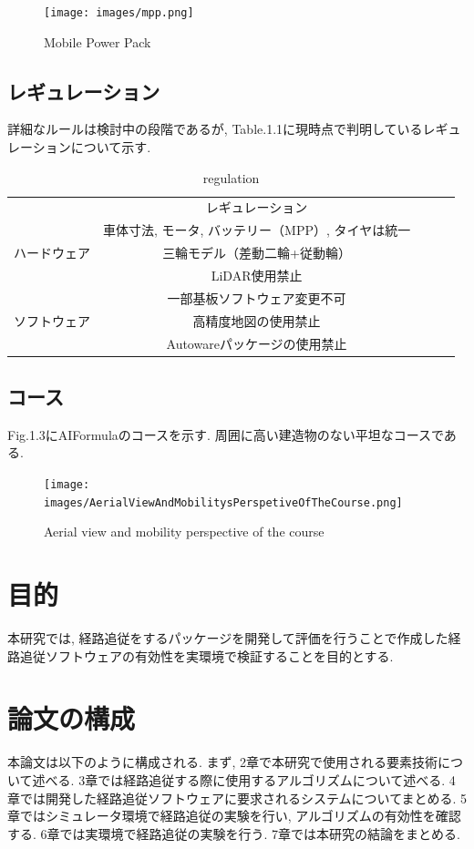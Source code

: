 \begin{figure}[H]
  \centering
 \texttt{[image: images/mpp.png]}
 \caption{Mobile Power Pack}
 \label{fig:MPP}
\end{figure}

\subsection{レギュレーション}
詳細なルールは検討中の段階であるが, Table.1.1に現時点で判明しているレギュレーションについて示す.

\begin{table}[H]
     \centering
     \caption{regulation}
     \begin{tabular}{|c|c|lll}
     \cline{1-2}
                              & レギュレーション              &  &  &  \\ \cline{1-2}
                                   & 車体寸法, モータ, バッテリー（MPP）, タイヤは統一 &  &  &  \\
     ハードウェア                       & 三輪モデル（差動二輪+従動輪）               &  &  &  \\
                                   & LiDAR使用禁止                     &  &  &  \\
                                   & 一部基板ソフトウェア変更不可                &  &  &  \\ \cline{1-2}
     \multicolumn{1}{|l|}{ソフトウェア} & 高精度地図の使用禁止                    &  &  &  \\
     \multicolumn{1}{|l|}{}       & Autowareパッケージの使用禁止            &  &  &  \\ \cline{1-2}
     \end{tabular}
\end{table}

\subsection{コース}
Fig.1.3にAIFormulaのコースを示す.
周囲に高い建造物のない平坦なコースである.


\begin{figure}[H]
  \centering
 \texttt{[image: images/AerialViewAndMobilitysPerspetiveOfTheCourse.png]}
 \caption{Aerial view and mobility perspective of the course}
 \label{fig:course}
\end{figure}


\section{目的}
本研究では, 経路追従をするパッケージを開発して評価を行うことで作成した経路追従ソフトウェアの有効性を実環境で検証することを目的とする.


\section{論文の構成}
本論文は以下のように構成される.
まず, 2章で本研究で使用される要素技術について述べる.
3章では経路追従する際に使用するアルゴリズムについて述べる.
4章では開発した経路追従ソフトウェアに要求されるシステムについてまとめる.
5章ではシミュレータ環境で経路追従の実験を行い, アルゴリズムの有効性を確認する.
6章では実環境で経路追従の実験を行う.
7章では本研究の結論をまとめる.

\newpage

